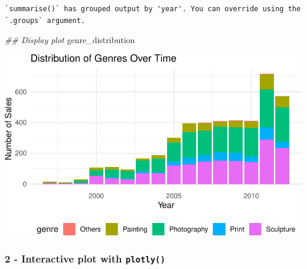 \documentclass[
  12pt,
]{article}
\newenvironment{Shaded}{\begin{snugshade}}{\end{snugshade}}
\newcommand{\DocumentationTok}[1]{\textcolor[rgb]{0.37,0.37,0.37}{\textit{#1}}}
\newcommand{\NormalTok}[1]{\textcolor[rgb]{0.00,0.23,0.31}{#1}}
\begin{document}
\begin{verbatim}
`summarise()` has grouped output by 'year'. You can override using the
`.groups` argument.
\end{verbatim}

\begin{Shaded}
\begin{Highlighting}[]
\DocumentationTok{\#\# Display plot}
\NormalTok{genre\_distribution}
\end{Highlighting}
\end{Shaded}

\includegraphics{506-HW-5_files/figure-pdf/unnamed-chunk-9-1.pdf}

\subsubsection{\texorpdfstring{2 - Interactive plot with
\texttt{plotly()}}{2 - Interactive plot with plotly()}}\label{interactive-plot-with-plotly}
\end{document}
